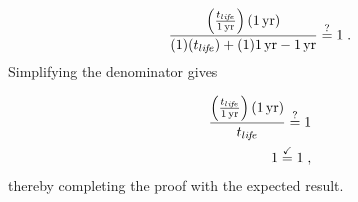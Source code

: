 \begin{equation}
  \frac{\left( \frac{t_{li\!f\!e}}{1\,\mathrm{yr}} \right) (1\,\mathrm{yr})}
  {(1) (t_{li\!f\!e}) + (1) 1\,\mathrm{yr} - 1\,\mathrm{yr}} \stackrel{?}{=} 1 \; .
\end{equation}
%
Simplifying the denominator gives

\begin{align}
  \frac{\left( \frac{t_{li\!f\!e}}{1\,\mathrm{yr}} \right) (1\,\mathrm{yr})}
       {t_{li\!f\!e}} \stackrel{?}{=} 1 \\
       1 \stackrel{\checkmark}{=} 1 \; ,
\end{align}
%
thereby completing the proof with the expected result.

